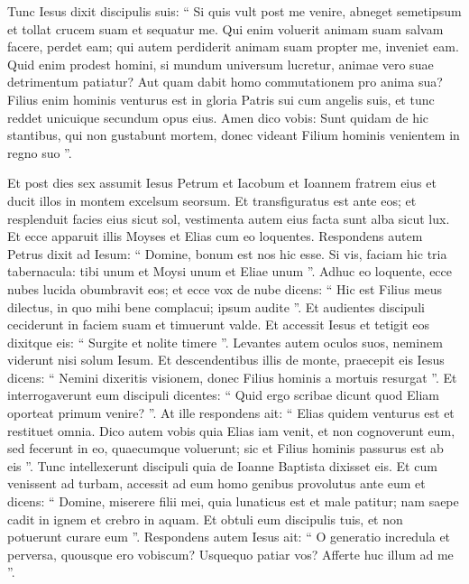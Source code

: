 \begin{biblechapter}
\begin{biblechapter}
\begin{biblechapter}
\begin{biblechapter}
\begin{biblechapter}
\begin{biblechapter}
\begin{biblechapter}
\begin{biblechapter}
\begin{biblechapter}
\begin{biblechapter}
\begin{biblechapter}
\begin{biblechapter}
\begin{biblechapter}
\begin{biblechapter}
\begin{biblechapter}
\begin{biblechapter}
 \verse Tunc Iesus dixit discipulis suis: “ Si quis vult post me venire, abneget semetipsum et tollat crucem suam et sequatur me. 
\verse Qui enim voluerit animam suam salvam facere, perdet eam; qui autem perdiderit animam suam propter me, inveniet eam. 
\verse Quid enim prodest homini, si mundum universum lucretur, animae vero suae detrimentum patiatur? Aut quam dabit homo commutationem pro anima sua? 
\verse Filius enim hominis venturus est in gloria Patris sui cum angelis suis, et tunc reddet unicuique secundum opus eius. 
\verse Amen dico vobis: Sunt quidam de hic stantibus, qui non gustabunt mortem, donec videant Filium hominis venientem in regno suo ”.
 
\begin{biblechapter}
\verse Et post dies sex assumit Iesus Petrum et Iacobum et Ioannem fratrem eius et ducit illos in montem excelsum seorsum. 
\verse Et transfiguratus est ante eos; et resplenduit facies eius sicut sol, vestimenta autem eius facta sunt alba sicut lux. 
\verse Et ecce apparuit illis Moyses et Elias cum eo loquentes. 
\verse Respondens autem Petrus dixit ad Iesum: “ Domine, bonum est nos hic esse. Si vis, faciam hic tria tabernacula: tibi unum et Moysi unum et Eliae unum ”. 
\verse Adhuc eo loquente, ecce nubes lucida obumbravit eos; et ecce vox de nube dicens: “ Hic est Filius meus dilectus, in quo mihi bene complacui; ipsum audite ”. 
\verse Et audientes discipuli ceciderunt in faciem suam et timuerunt valde. 
\verse Et accessit Iesus et tetigit eos dixitque eis: “ Surgite et nolite timere ”. 
 \verse Levantes autem oculos suos, neminem viderunt nisi solum Iesum.
 \verse Et descendentibus illis de monte, praecepit eis Iesus dicens: “ Nemini dixeritis visionem, donec Filius hominis a mortuis resurgat ”.
 \verse Et interrogaverunt eum discipuli dicentes: “ Quid ergo scribae dicunt quod Eliam oporteat primum venire? ”. 
\verse At ille respondens ait: “ Elias quidem venturus est et restituet omnia. 
\verse Dico autem vobis quia Elias iam venit, et non cognoverunt eum, sed fecerunt in eo, quaecumque voluerunt; sic et Filius hominis passurus est ab eis ”. 
\verse Tunc intellexerunt discipuli quia de Ioanne Baptista dixisset eis.
 \verse Et cum venissent ad turbam, accessit ad eum homo genibus provolutus ante eum 
\verse et dicens: “ Domine, miserere filii mei, quia lunaticus est et male patitur; nam saepe cadit in ignem et crebro in aquam. 
\verse Et obtuli eum discipulis tuis, et non potuerunt curare eum ”. 
\verse Respondens autem Iesus ait: “ O generatio incredula et perversa, quousque ero vobiscum? Usquequo patiar vos? Afferte huc illum ad me ”. 

\end{biblechapter}
\end{biblechapter}
\end{biblechapter}
\end{biblechapter}
\end{biblechapter}
\end{biblechapter}
\end{biblechapter}
\end{biblechapter}
\end{biblechapter}
\end{biblechapter}
\end{biblechapter}
\end{biblechapter}
\end{biblechapter}
\end{biblechapter}
\end{biblechapter}
\end{biblechapter}
\end{biblechapter}

